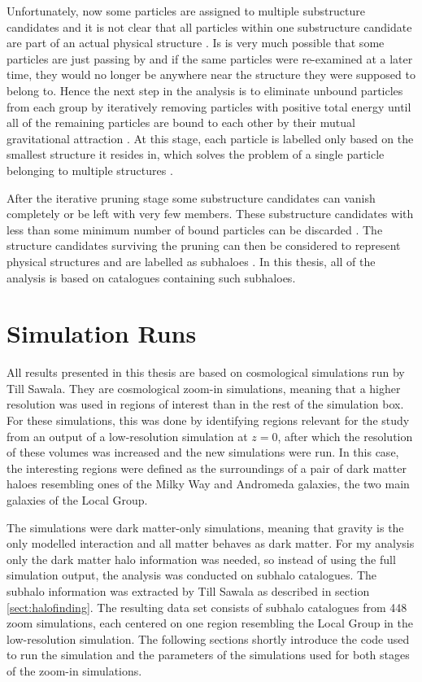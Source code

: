 \documentclass[english, twoside]{HYgradu}
\begin{document}
Unfortunately, now some particles are assigned to multiple substructure candidates and it is not clear that all particles within one substructure candidate are part of an actual physical structure \citep{springel2001populating}. Is is very much possible that some particles are just passing by and if the same particles were re-examined at a later time, they would no longer be anywhere near the structure they were supposed to belong to. Hence the next step in the analysis is to eliminate unbound particles from each group by iteratively removing particles with positive total energy until all of the remaining particles are bound to each other by their mutual gravitational attraction \citep{springel2001populating}. At this stage, each particle is labelled only based on the smallest structure it resides in, which solves the problem of a single particle belonging to multiple structures \citep{springel2001populating}.

After the iterative pruning stage some substructure candidates can vanish completely or be left with very few members. These substructure candidates with less than some minimum number of bound particles can be discarded \citep{springel2001populating}. The structure candidates surviving the pruning can then be considered to represent physical structures and are labelled as subhaloes \citep{springel2001populating}. In this thesis, all of the analysis is based on catalogues containing such subhaloes. 

\section{Simulation Runs} \label{sect:simruns}
All results presented in this thesis are based on cosmological simulations run by Till Sawala. They are cosmological zoom-in simulations, meaning that a higher resolution was used in regions of interest than in the rest of the simulation box. For these simulations, this was done by identifying regions relevant for the study from an output of a low-resolution simulation at $z=0$, after which the resolution of these volumes was increased and the new simulations were run. In this case, the interesting regions were defined as the surroundings of a pair of dark matter haloes resembling ones of the Milky Way and Andromeda galaxies, the two main galaxies of the Local Group.

The simulations were dark matter-only simulations, meaning that gravity is the only modelled interaction and all matter behaves as dark matter. For my analysis only the dark matter halo information was needed, so instead of using the full simulation output, the analysis was conducted on subhalo catalogues. The subhalo information was extracted by Till Sawala as described in section \ref{sect:halofinding}. The resulting data set consists of subhalo catalogues from 448 zoom simulations, each centered on one region resembling the Local Group in the low-resolution simulation. The following sections shortly introduce the code used to run the simulation and the parameters of the simulations used for both stages of the zoom-in simulations.
\end{document}
